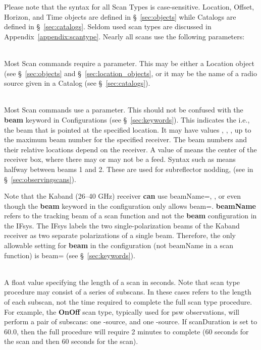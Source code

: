 Please note that the syntax for all Scan Types is case-sensitive.
Location, Offset, Horizon, and Time objects are defined in
\S~\ref{sec:objects} while Catalogs are defined in \S~\ref{sec:catalogs}.
Seldom used scan types are discussed in Appendix~\ref{appendix:scantype}.
Nearly all scans use the following parameters:
\begin{description}[leftmargin=*]
\item[Location] \ \\
Most Scan commands require a  parameter.  This may be either a 
Location object (see \S~\ref{sec:objects} and \S~\ref{sec:location_objects},
or it may be the name of a radio source given in a Catalog
(see \S~\ref{sec:catalogs}).

\item[beamName] \ \\
Most Scan commands use a  parameter.  This should not be confused
with the {\bf beam} keyword in Configurations (see \S~\ref{sec:keywords}).
This indicates the  i.e., the beam that is pointed at the 
specified location.  It may have values , , , up to the
maximum beam number for the specified receiver.  The beam numbers and their
relative locations depend on the receiver.  A value of  means the center
of the receiver box, where there may or may not be a feed.  Syntax such as
 means halfway between beams 1 and 2.  These are used for subreflector
nodding, (see  in \S~\ref{sec:observingscans}).

Note that the \gls{Kaband} (26--40 GHz) receiver {\bf can} use beamName=,
,  or  even though the {\bf beam} keyword in the configuration
only allows beam=.  {\bf beamName} refers to the tracking beam of a scan
function and not the {\bf beam} configuration in the \gls{IFsys}.
The \gls{IFsys} labels the two single-polarization beams of the \gls{Kaband}
receiver as two separate polarizations of a single beam.  Therefore, the only
allowable setting for {\bf beam} in the configuration (not beamName in a scan
function) is beam= (see \S~\ref{sec:keywords}).

\item[scanDuration]\ \\
A float value specifying the length of a scan in seconds. Note that scan
type procedure may consist of a series of subscans.  In these cases
 refers to the length of each subscan, not the time
required to complete the full scan type procedure.  For example, the
{\bfseries{\textcolor{pythonKeywords}{OnOff}}} scan type, typically used
for \gls{psw} observations, will perform a pair of subscans: one
-source, and one -source.  If scanDuration is set to 60.0,
then the full procedure will require 2 minutes to complete (60 seconds
for the  scan and then 60 seconds for the  scan).
\end{description}


